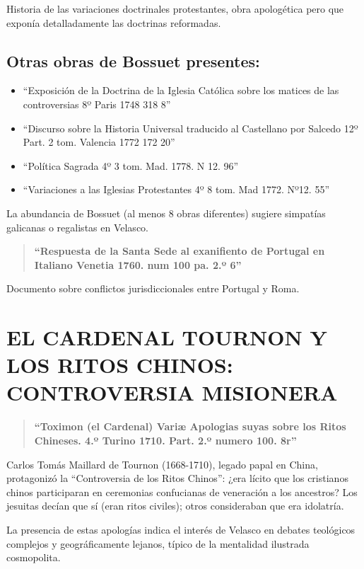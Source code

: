\documentclass[12pt,a4paper]{article}
\begin{document}
Historia de las variaciones doctrinales protestantes, obra apologética pero que exponía detalladamente las doctrinas reformadas.

\subsection*{Otras obras de Bossuet presentes:}
\begin{itemize}
    \item ``Exposición de la Doctrina de la Iglesia Católica sobre los matices de las controversias 8º Paris 1748 318 8''
    \item ``Discurso sobre la Historia Universal traducido al Castellano por Salcedo 12º Part. 2 tom. Valencia 1772 172 20''
    \item ``Política Sagrada 4º 3 tom. Mad. 1778. N 12. 96''
    \item ``Variaciones a las Iglesias Protestantes 4º 8 tom. Mad 1772. Nº12. 55''
\end{itemize}

La abundancia de Bossuet (al menos 8 obras diferentes) sugiere simpatías galicanas o regalistas en Velasco.

\begin{quote}
\textbf{``Respuesta de la Santa Sede al exanifiento de Portugal en Italiano Venetia 1760. num 100 pa. 2.º 6''}
\end{quote}

Documento sobre conflictos jurisdiccionales entre Portugal y Roma.

\section{EL CARDENAL TOURNON Y LOS RITOS CHINOS: CONTROVERSIA MISIONERA}

\begin{quote}
\textbf{``Toximon (el Cardenal) Variæ Apologias suyas sobre los Ritos Chineses. 4.º Turino 1710. Part. 2.º numero 100. 8r''}
\end{quote}

Carlos Tomás Maillard de Tournon (1668-1710), legado papal en China, protagonizó la ``Controversia de los Ritos Chinos'': ¿era lícito que los cristianos chinos participaran en ceremonias confucianas de veneración a los ancestros? Los jesuitas decían que sí (eran ritos civiles); otros consideraban que era idolatría.

La presencia de estas apologías indica el interés de Velasco en debates teológicos complejos y geográficamente lejanos, típico de la mentalidad ilustrada cosmopolita.
\end{document}
